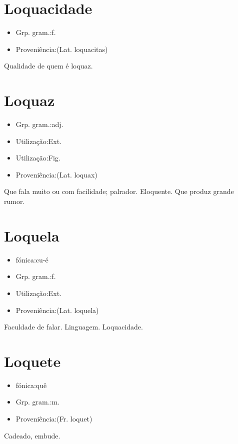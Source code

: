 \section{Loquacidade}
\begin{itemize}
\item {Grp. gram.:f.}
\end{itemize}
\begin{itemize}
\item {Proveniência:(Lat. \textunderscore loquacitas\textunderscore )}
\end{itemize}
Qualidade de quem é loquaz.
\section{Loquaz}
\begin{itemize}
\item {Grp. gram.:adj.}
\end{itemize}
\begin{itemize}
\item {Utilização:Ext.}
\end{itemize}
\begin{itemize}
\item {Utilização:Fig.}
\end{itemize}
\begin{itemize}
\item {Proveniência:(Lat. \textunderscore loquax\textunderscore )}
\end{itemize}
Que fala muito ou com facilidade; palrador.
Eloquente.
Que produz grande rumor.
\section{Loquela}
\begin{itemize}
\item {fónica:cu-é}
\end{itemize}
\begin{itemize}
\item {Grp. gram.:f.}
\end{itemize}
\begin{itemize}
\item {Utilização:Ext.}
\end{itemize}
\begin{itemize}
\item {Proveniência:(Lat. \textunderscore loquela\textunderscore )}
\end{itemize}
Faculdade de falar.
Linguagem.
Loquacidade.
\section{Loquete}
\begin{itemize}
\item {fónica:quê}
\end{itemize}
\begin{itemize}
\item {Grp. gram.:m.}
\end{itemize}
\begin{itemize}
\item {Proveniência:(Fr. \textunderscore loquet\textunderscore )}
\end{itemize}
Cadeado, embude.
